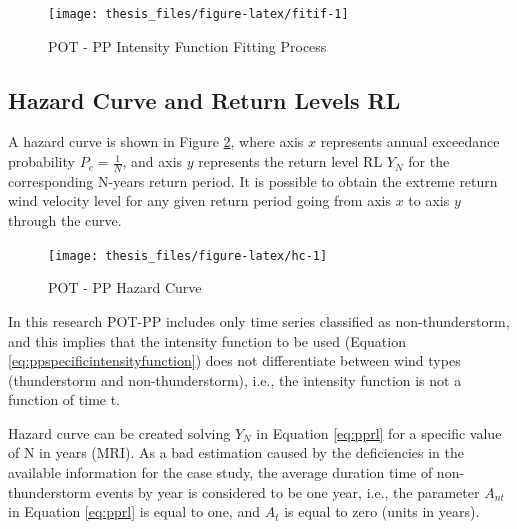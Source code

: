 \documentclass[12pt,twoside]{reedthesis}
\begin{document}
\footnotesize
\begin{figure}

{\centering \texttt{[image: thesis\_files/figure-latex/fitif-1]} 

}

\caption{POT - PP Intensity Function Fitting Process}\label{fig:fitif}
\end{figure}
\normalsize

\hypertarget{hazard-curve-and-return-levels-rl}{%
\subsection{Hazard Curve and Return Levels RL}\label{hazard-curve-and-return-levels-rl}}

A hazard curve is shown in Figure \ref{fig:hc}, where axis \(x\) represents annual exceedance probability \(P_e = \frac{1}{N}\), and axis \(y\) represents the return level RL \(Y_N\) for the corresponding N-years return period. It is possible to obtain the extreme return wind velocity level for any given return period going from axis \(x\) to axis \(y\) through the curve.

\footnotesize
\begin{figure}

{\centering \texttt{[image: thesis\_files/figure-latex/hc-1]} 

}

\caption{POT - PP Hazard Curve}\label{fig:hc}
\end{figure}
\normalsize

In this research POT-PP includes only time series classified as non-thunderstorm, and this implies that the intensity function to be used (Equation \eqref{eq:ppspecificintensityfunction}) does not differentiate between wind types (thunderstorm and non-thunderstorm), i.e., the intensity function is not a function of time t.

Hazard curve can be created solving \(Y_N\) in Equation \eqref{eq:pprl} for a specific value of N in years (MRI). As a bad estimation caused by the deficiencies in the available information for the case study, the average duration time of non-thunderstorm events by year is considered to be one year, i.e., the parameter \(A_{nt}\) in Equation \eqref{eq:pprl} is equal to one, and \(A_t\) is equal to zero (units in years).
\end{document}
